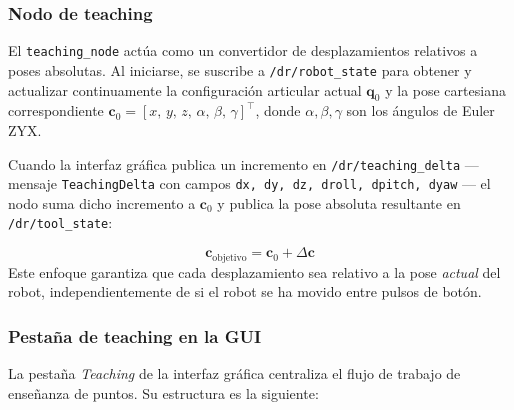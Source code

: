 \documentclass{article}
\begin{document}
\subsubsection*{Nodo de teaching}

\begin{sloppypar}
El \texttt{teaching\_node} actúa como un convertidor de desplazamientos relativos a poses absolutas. Al iniciarse, se suscribe a \texttt{/dr/robot\_state} para obtener y actualizar continuamente la configuración articular actual $\mathbf{q}_0$ y la pose cartesiana correspondiente $\mathbf{c}_0 = [x,\,y,\,z,\,\alpha,\,\beta,\,\gamma]^\top$, donde $\alpha, \beta, \gamma$ son los ángulos de Euler ZYX.

Cuando la interfaz gráfica publica un incremento en \texttt{/dr/teaching\_delta} --- mensaje \texttt{TeachingDelta} con campos \texttt{dx, dy, dz, droll, dpitch, dyaw} --- el nodo suma dicho incremento a $\mathbf{c}_0$ y publica la pose absoluta resultante en \texttt{/dr/tool\_state}:
\end{sloppypar}
\[
\mathbf{c}_{\text{objetivo}} = \mathbf{c}_0 + \Delta\mathbf{c}
\]
Este enfoque garantiza que cada desplazamiento sea relativo a la pose \textit{actual} del robot, independientemente de si el robot se ha movido entre pulsos de botón.

\subsubsection*{Pestaña de teaching en la GUI}

La pestaña \textit{Teaching} de la interfaz gráfica centraliza el flujo de trabajo de enseñanza de puntos. Su estructura es la siguiente:
\end{document}
